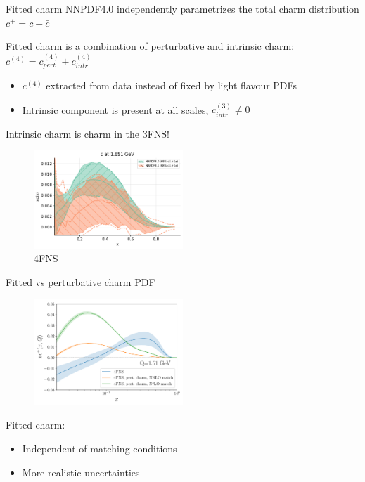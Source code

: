 \documentclass[aspectratio=43, 8pt,t]{beamer}
\begin{document}
\begin{frame}{Fitted charm}
  NNPDF4.0 independently parametrizes the total charm distribution $c^+=c+\bar{c}$

  \vspace*{1em}
  Fitted charm is a combination of perturbative and intrinsic charm: \\
  $c^{(4)} = c_{pert}^{(4)}+c_{intr}^{(4)}$
  \begin{itemize}
    \item $c^{(4)}$ extracted from data instead of fixed by light flavour PDFs
    \item Intrinsic component is present at all scales, $c_{intr}^{(3)}\neq 0$
  \end{itemize}

  \vspace*{1em}
  Intrinsic charm is charm in the 3FNS!

  \begin{figure}
    \includegraphics[width=0.5\textwidth]{nnpdf40_vs_nnpdf31.pdf}
    \caption*{4FNS}
  \end{figure}
\end{frame}

\begin{frame}{Fitted vs perturbative charm PDF}
  \begin{figure}
    \includegraphics[width=0.5\textwidth]{pch_vs_fitted_forward.pdf}
  \end{figure}

  Fitted charm:
  \begin{itemize}
    \item Independent of matching conditions
    \item More realistic uncertainties
  \end{itemize}
\end{frame}
\end{document}
